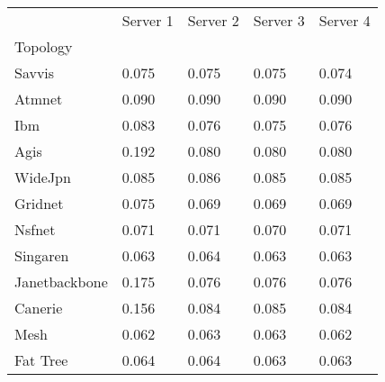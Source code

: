 \begin{tabular}{lllll}
 & Server 1 & Server 2 & Server 3 & Server 4 \\
Topology &  &  &  &  \\
Savvis & 0.075 & 0.075 & 0.075 & 0.074 \\
Atmnet & 0.090 & 0.090 & 0.090 & 0.090 \\
Ibm & 0.083 & 0.076 & 0.075 & 0.076 \\
Agis & 0.192 & 0.080 & 0.080 & 0.080 \\
WideJpn & 0.085 & 0.086 & 0.085 & 0.085 \\
Gridnet & 0.075 & 0.069 & 0.069 & 0.069 \\
Nsfnet & 0.071 & 0.071 & 0.070 & 0.071 \\
Singaren & 0.063 & 0.064 & 0.063 & 0.063 \\
Janetbackbone & 0.175 & 0.076 & 0.076 & 0.076 \\
Canerie & 0.156 & 0.084 & 0.085 & 0.084 \\
Mesh & 0.062 & 0.063 & 0.063 & 0.062 \\
Fat Tree & 0.064 & 0.064 & 0.063 & 0.063 \\
\end{tabular}
